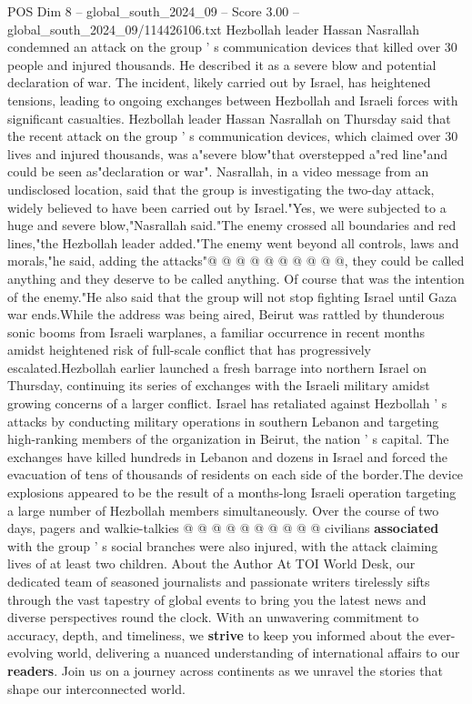 \begin{textsample}{POS Dim 8 – global\_south\_2024\_09 – Score 3.00 – global\_south\_2024\_09/114426106.txt}  \label{ex:f8_pos_288}
Hezbollah leader Hassan Nasrallah condemned an attack on the group ' s communication devices that killed over 30 people and injured thousands.
He described it as a severe blow and potential declaration of war.
The incident, likely carried out by Israel, has heightened tensions, leading to ongoing exchanges between Hezbollah and Israeli forces with significant casualties.
Hezbollah leader Hassan Nasrallah on Thursday said that the recent attack on the group ' s communication devices, which claimed over 30 lives and injured thousands, was a"severe blow"that overstepped a"red line"and could be seen as"declaration or war".
Nasrallah, in a video message from an undisclosed location, said that the group is investigating the two-day attack, widely believed to have been carried out by Israel."Yes, we were subjected to a huge and severe blow,"Nasrallah said."The enemy crossed all boundaries and red lines,"the Hezbollah leader added."The enemy went beyond all controls, laws and morals,"he said, adding the attacks"@ @ @ @ @ @ @ @ @ @, they could be called anything and they deserve to be called anything.
Of course that was the intention of the enemy."He also said that the group will not stop fighting Israel until Gaza war ends.While the address was being aired, Beirut was rattled by thunderous sonic booms from Israeli warplanes, a familiar occurrence in recent months amidst heightened risk of full-scale conflict that has progressively escalated.Hezbollah earlier launched a fresh barrage into northern Israel on Thursday, continuing its series of exchanges with the Israeli military amidst growing concerns of a larger conflict.
Israel has retaliated against Hezbollah ' s attacks by conducting military operations in southern Lebanon and targeting high-ranking members of the organization in Beirut, the nation ' s capital.
The exchanges have killed hundreds in Lebanon and dozens in Israel and forced the evacuation of tens of thousands of residents on each side of the border.The device explosions appeared to be the result of a months-long Israeli operation targeting a large number of Hezbollah members simultaneously.
Over the course of two days, pagers and walkie-talkies @ @ @ @ @ @ @ @ @ @ civilians \textbf{associated} with the group ' s social branches were also injured, with the attack claiming lives of at least two children.
About the Author At TOI World Desk, our dedicated team of seasoned journalists and passionate writers tirelessly sifts through the vast tapestry of global events to bring you the latest news and diverse perspectives round the clock.
With an unwavering commitment to accuracy, depth, and timeliness, we \textbf{strive} to keep you informed about the ever-evolving world, delivering a nuanced understanding of international affairs to our \textbf{readers}.
Join us on a journey across continents as we unravel the stories that shape our interconnected world.

\end{textsample}
